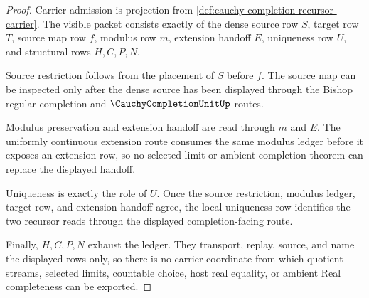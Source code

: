 \begin{proof}
Carrier admission is projection from \autoref{def:cauchy-completion-recursor-carrier}. The visible packet consists exactly of the dense source row $S$, target row $T$, source map row $f$, modulus row $m$, extension handoff $E$, uniqueness row $U$, and structural rows $H,C,P,N$.

Source restriction follows from the placement of $S$ before $f$. The source map can be inspected only after the dense source has been displayed through the Bishop regular completion and $\CauchyCompletionUnitUp$ routes.

Modulus preservation and extension handoff are read through $m$ and $E$. The uniformly continuous extension route consumes the same modulus ledger before it exposes an extension row, so no selected limit or ambient completion theorem can replace the displayed handoff.

Uniqueness is exactly the role of $U$. Once the source restriction, modulus ledger, target row, and extension handoff agree, the local uniqueness row identifies the two recursor reads through the displayed completion-facing route.

Finally, $H,C,P,N$ exhaust the ledger. They transport, replay, source, and name the displayed rows only, so there is no carrier coordinate from which quotient streams, selected limits, countable choice, host real equality, or ambient Real completeness can be exported.
\end{proof}


